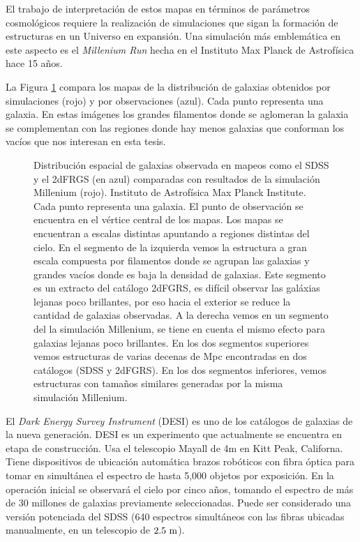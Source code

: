 \documentclass[preprint]{aastex62}
\begin{document}
El trabajo de interpretaci\'on de estos mapas en t\'erminos de
par\'ametros cosmol\'ogicos requiere la realizaci\'on de simulaciones
que sigan la formaci\'on de estructuras en un Universo en expansi\'on.
Una simulación m\'as emblem\'atica en este aspecto es el \textit{Millenium Run}
hecha en el Instituto Max Planck de Astrof\'isica hace 15 a\~nos. 

La Figura \ref{fig:pie_millenium_walls} compara los mapas de la
distribuci\'on de galaxias obtenidos por simulaciones (rojo) y por
observaciones (azul).
Cada punto representa una galaxia.
En estas im\'agenes los grandes filamentos donde se aglomeran la
galaxia se complementan con las regiones donde hay menos galaxias que
conforman los vac\'ios que nos interesan en esta tesis.

  \begin{figure}
    \caption{Distribuci\'on espacial de galaxias observada en mapeos como el SDSS y
      el 2dFRGS (en azul) comparadas con resultados de la simulación Millenium (rojo).
      Instituto de Astrofísica Max Planck Institute. Cada punto representa una galaxia.
      El punto de observación se encuentra en el vértice central de los mapas. Los mapas
      se encuentran a escalas distintas apuntando a regiones distintas del cielo.
      En el segmento de la izquierda vemos la estructura a gran escala compuesta por
      filamentos donde se agrupan las galaxias y grandes vacíos donde es baja la densidad
      de galaxias. Este segmento es un extracto del catálogo 2dFGRS, es difícil observar
      las galáxias lejanas poco brillantes, por eso hacia el exterior se reduce la cantidad
      de galaxias observadas. A la derecha vemos en un segmento del la simulación Millenium,
      se tiene en cuenta el mismo efecto para galaxias lejanas poco brillantes. En los dos
      segmentos superiores vemos estructuras de varias decenas de Mpc encontradas en dos
      catálogos (SDSS y 2dFGRS). En los dos segmentos inferiores, vemos estructuras con
      tamaños similares generadas por la misma simulación Millenium.
      \label{fig:pie_millenium_walls}}
  \end{figure}
  
  El \textit{Dark Energy Survey Instrument} (DESI) es uno de los catálogos de galaxias
  de la nueva generación. DESI es un experimento que actualmente se encuentra en etapa
  de construcción. Usa el telescopio Mayall de 4m en Kitt Peak, Californa. Tiene
  dispositivos de ubicación automática brazos robóticos con fibra óptica para tomar en simultánea
  el espectro de hasta 5,000 objetos por exposición. En la operación inicial se observará el cielo por
  cinco años, tomando el espectro de más de 30 millones de galaxias previamente seleccionadas.
  Puede ser considerado una versión potenciada del SDSS (640 espectros simultáneos con las
  fibras ubicadas manualmente, en un telescopio de $2.5 \rm~m$).
\end{document}
